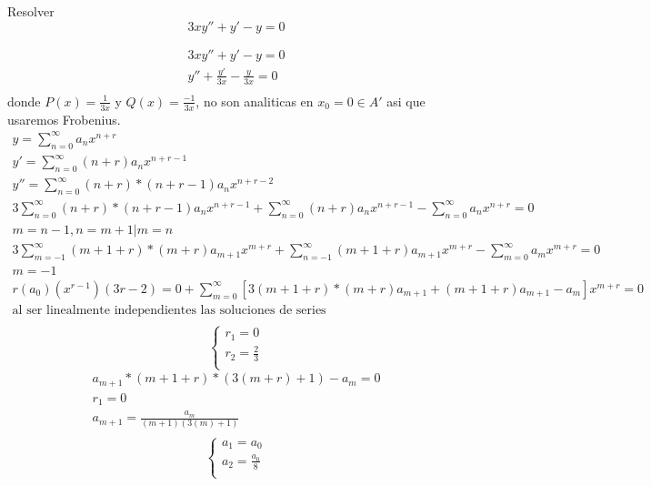 \begin{prob}
    Resolver $$3xy''+y'-y=0$$
\end{prob}
\begin{mdframed}
  \begin{gather*}
      3xy''+y'-y=0\\
      y''+\frac{y'}{3x}-\frac{y}{3x}=0\\
  \end{gather*}
  donde $P(x)=\frac{1}{3x}$ y $Q(x)=\frac{-1}{3x}$, no son analiticas en $x_0 =0 \in A'$ asi que usaremos Frobenius.
  \begin{gather*}
      y = \sum_{n=0}^{\infty} a_n x^{n+r}\\
      y' = \sum_{n=0}^{\infty} ({n+r})a_n x^{n+r-1}\\
      y'' = \sum_{n=0}^{\infty}  ({n+r})*({n+r-1}) a_n x^{n+r-2}\\
      3 \sum_{n=0}^{\infty}  ({n+r})*({n+r-1}) a_n x^{n+r-1}+\sum_{n=0}^{\infty} ({n+r})a_n x^{n+r-1}- \sum_{n=0}^{\infty} a_n x^{n+r}=0\\
      m = n-1, n=m+1 \vert m=n\\
      3 \sum_{m=-1}^{\infty}  ({m+1+r})*({m+r}) a_{m+1} x^{m+r}+\sum_{n=-1}^{\infty} ({m+1+r})a_{m+1} x^{m+r}- \sum_{m=0}^{\infty} a_m x^{m+r}=0\\
      m = -1\\
      r(a_0)(x^{r-1})(3r-2)=0+  \sum_{m=0}^{\infty}  [3({m+1+r})*({m+r}) a_{m+1}+({m+1+r})a_{m+1}-a_m]x^{m+r}=0\\
      \text{al ser linealmente independientes las soluciones de series}\\     
  \end{gather*}
  \begin{equation}
    \begin{cases}
        r_1=0\\
        r_2=\frac{2}{3}\\
    \end{cases}
\end{equation}
\begin{gather*}
    a_{m+1}*(m+1+r)*(3(m+r)+1)-a_m=0\\
    r_1=0\\
    a_{m+1}=\frac{a_m}{(m+1)(3(m)+1)}\\
\end{gather*}
  \begin{equation}
    \begin{cases}
        a_1=a_0\\
        a_2=\frac{a_0}{8}\\

\end{cases}
\end{equation}
\end{mdframed}
